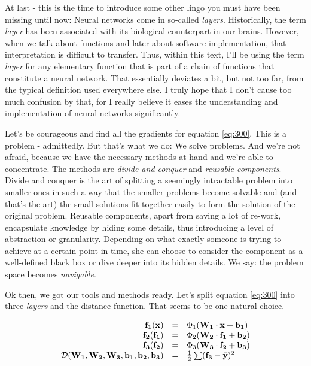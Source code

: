 \documentclass[]{report}
\begin{document}
\bigskip

At last - this is the time to introduce some other lingo you must have been missing until now: Neural networks come in so-called \emph{layers}. Historically, the term \emph{layer} has been associated with its biological counterpart in our brains. However, when we talk about functions and later about software implementation, that interpretation is difficult to transfer. Thus, within this text, I'll be using the term \emph{layer} for any elementary function that is part of a chain of functions that constitute a neural network. That essentially deviates a bit, but not too far, from the typical definition used everywhere else. I truly hope that I don't cause too much confusion by that, for I really believe it eases the understanding and implementation of neural networks significantly.

\bigskip

Let's be courageous and find all the gradients for equation \ref{eq:300}. This is a problem - admittedly. But that's what we do: We solve problems. And we're not afraid, because we have the necessary methods at hand and we're able to concentrate. The methods are \emph{divide and conquer} and \emph{reusable components}. Divide and conquer is the art of splitting a seemingly intractable problem into smaller ones in such a way that the smaller problems become solvable and (and that's the art) the small solutions fit together easily to form the solution of the original problem. Reusable components, apart from saving a lot of re-work, encapsulate knowledge by hiding some details, thus introducing a level of abstraction or granularity. Depending on what exactly someone is trying to achieve at a certain point in time, she can choose to consider the component as a well-defined black box or dive deeper into its hidden details. We say: the problem space becomes \emph{navigable}.

\bigskip

Ok then, we got our tools and methods ready. Let's split equation \ref{eq:300} into three \emph{layers} and the distance function. That seems to be one natural choice.

\begin{equation}
\begin{array}{r c l }
\mathbf{f_1}(\mathbf{x})& =& \Phi_1(\mathbf{W_1} \cdot \mathbf{x} + \mathbf{b_1}) \\ 
\mathbf{f_2}(\mathbf{f_1})& =& \Phi_2(\mathbf{W_2} \cdot \mathbf{f_1} + \mathbf{b_2}) \\
\mathbf{f_3}(\mathbf{f_2})& =& \Phi_3(\mathbf{W_3} \cdot \mathbf{f_2} + \mathbf{b_3}) \\
\mathcal{D}(\mathbf{W_1}, \mathbf{W_2}, \mathbf{W_3}, \mathbf{b_1}, \mathbf{b_2}, \mathbf{b_3}) & =&  \frac{1}{2} \sum( \mathbf{f_3} - \bar{\mathbf{y}})^2
\end{array}
\end{equation}
\end{document}
